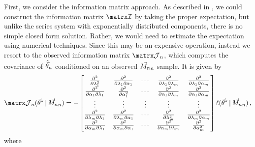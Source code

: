 \documentclass[../main.tex]{subfiles}
\begin{document}
First, we consider the information matrix approach. As described in \Cref{}, we could construct the information matrix $\infomatrx$ by taking the proper expectation, but unlike the series system with exponentially distributed components, there is no simple closed form solution. Rather, we would need to estimate the expectation using numerical techniques. Since this may be an expensive operation, instead we resort to the observed information matrix $\observed_n$, which computes the covariance of $\hat{\vec\theta}_n$ conditioned on an observed $\vec{M_n}_n$ sample. It is given by
\begin{equation}
\label{info_matrix_lom}
    \observed_n(\tparam{\vec\theta} \given \mfs_n) = -
    \begin{bmatrix}
        \frac{\partial^2} {\partial \lambda_1^2} &
        \frac{\partial^2} {\partial \lambda_1 \partial \alpha_1 } &
        \cdots &
        \frac{\partial^2} {\partial \lambda_1 \partial \lambda_m } &
        \frac{\partial^2} {\partial \lambda_1 \partial \alpha_m }\\
        \frac{\partial^2} {\partial \alpha_1 \partial \lambda_1 } &
        \frac{\partial^2} {\partial \alpha_1^2} &
        \cdots &
        \frac{\partial^2} {\partial \alpha_1 \partial \lambda_m } &
        \frac{\partial^2} {\partial \alpha_1 \partial \alpha_m }\\
        \vdots &    \vdots &    \vdots &    \vdots &    \vdots\\
        \frac{\partial^2} {\partial \lambda_m \partial \lambda_1 } &
        \frac{\partial^2} {\partial \lambda_m \partial \alpha_1 } &
        \cdots &
        \frac{\partial^2} {\partial \lambda_m^2} &
        \frac{\partial^2} {\partial \lambda_m \partial \alpha_m}\\
        \frac{\partial^2} {\partial \alpha_m \partial \lambda_1 } &
        \frac{\partial^2} {\partial \alpha_m \partial \alpha_1 } &
        \cdots &
        \frac{\partial^2} {\partial \alpha_m \partial \lambda_m} &
        \frac{\partial^2} {\partial \alpha_m^2}
    \end{bmatrix} \ell(\tparam{\vec\theta} \given \mfs_n)\,,
\end{equation}
where
\end{document}
